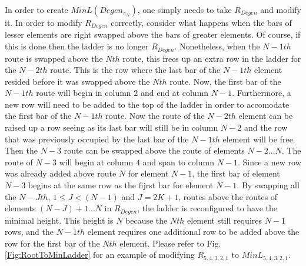    In order to create $MinL(Degen_{\pi_{N}})$, one simply needs to 
   take $R_{Degen}$ and modify it. In order to modify $R_{Degen}$ correctly, consider what happens when 
   the bars of lesser elements are right swapped above the bars of greater elements. Of course, if this is done then 
   the ladder is no longer $R_{Degen}$. Nonetheless, when the $N-1th$ route is swapped above the $Nth$ route, 
   this frees up an extra row in the ladder for the $N-2th$ route. This is the row where the last bar of the $N-1th$ element resided
   before it was swapped above the $Nth$ route. Now, the first bar of the $N-1th$ route will begin in column $2$ and end at column $N-1$. 
   Furthermore, a new row will need to be added to the top of the ladder in order to accomodate the first bar of the $N-1th$ route. Now the route 
   of the $N-2th$ element can be raised up a row seeing as its last bar will still be in column $N-2$ and the row 
   that was previously occupied by the last bar of the $N-1th$ element will be free. Then the $N-3$ route can be swapped above 
   the route of elements $N-2 \dots N$. The route of $N-3$ will begin at column $4$ and span to column $N-1$. 
   Since a new row was already added above route $N$ for element $N-1$, 
   the first bar of element $N-3$ begins at the 
   same row as the fijrst bar for element $N-1$. By  swapping 
   all the  $N-Jth$, $1 \leq J < (N-1)$ and $J=2K+1$, routes above the routes of elements 
   $(N-J)+1 \dots N$ in $R_{Degen}$, the ladder is reconfigured to have the minimal height. This height is $N$ because the 
   $Nth$ element still requires $N-1$ rows, and the $N-1th$ element requires one additional row to be added above 
   the row for the first bar of the $Nth$ element. Please refer 
   to Fig. \ref{Fig:RootToMinLadder} for an example of modifying $R_{5,4,3,2,1}$ to $MinL_{5,4,3,2,1}$.\pagebreak


